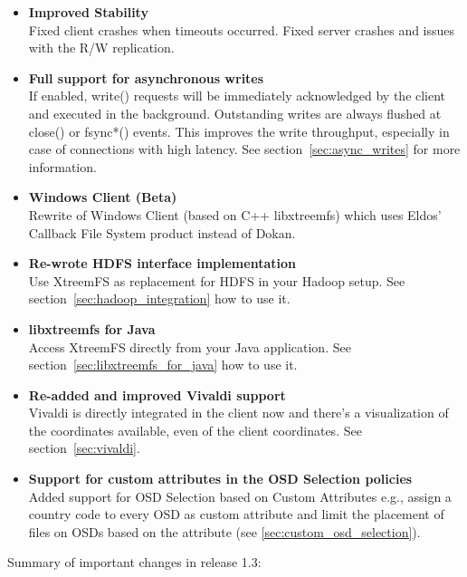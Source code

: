 \documentclass[a4paper,10pt]{book}
\begin{document}
\begin{itemize}
 \item \textbf{Improved Stability}\\
    Fixed client crashes when timeouts occurred. Fixed server crashes and issues with the R/W replication.
 \item \textbf{Full support for asynchronous writes}\\
    If enabled, write() requests will be immediately acknowledged by the client and executed in the background. Outstanding writes are always flushed at close() or fsync*() events. This improves the write throughput, especially in case of connections with high latency. See section~\ref{sec:async_writes} for more information.
 \item \textbf{Windows Client (Beta)}\\
    Rewrite of Windows Client (based on C++ libxtreemfs) which uses Eldos' Callback File System product instead of Dokan.
 \item \textbf{Re-wrote HDFS interface implementation}\\
    Use XtreemFS as replacement for HDFS in your Hadoop setup. See section~\ref{sec:hadoop_integration} how to use it.
 \item \textbf{libxtreemfs for Java}\\
    Access XtreemFS directly from your Java application. See section~\ref{sec:libxtreemfs_for_java} how to use it.
 \item \textbf{Re-added and improved Vivaldi support}\\
    Vivaldi is directly integrated in the client now and there's a visualization of the coordinates available, even of the client coordinates. See section~\ref{sec:vivaldi}.
 \item \textbf{Support for custom attributes in the OSD Selection policies}\\
    Added support for OSD Selection based on Custom Attributes e.g., assign a country code to every OSD as custom attribute and limit the placement of files on OSDs based on the attribute (see \ref{sec:custom_osd_selection}).
\end{itemize}

Summary of important changes in release 1.3:
\end{document}
